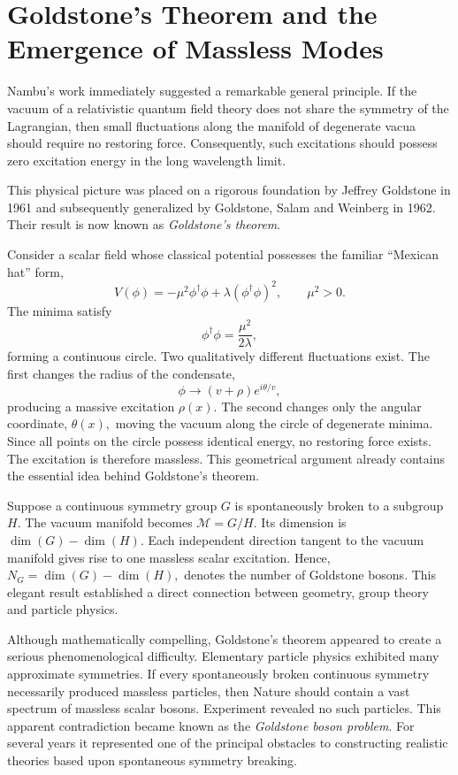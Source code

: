 \section{Goldstone's Theorem and the Emergence of Massless Modes}
\label{sec:goldstone_history}
Nambu's work immediately suggested a remarkable general principle.
If the vacuum of a relativistic quantum field theory does not share the
symmetry of the Lagrangian, then small fluctuations along the manifold
of degenerate vacua should require no restoring force. Consequently,
such excitations should possess zero excitation energy in the long
wavelength limit.

This physical picture was placed on a rigorous foundation by Jeffrey
Goldstone in 1961 and subsequently generalized by Goldstone, Salam and
Weinberg in 1962.
Their result is now known as \emph{Goldstone's theorem}.

Consider a scalar field whose classical potential possesses the familiar
``Mexican hat'' form,
\[V(\phi)=-\mu^2\phi^\dagger\phi
+\lambda(\phi^\dagger\phi)^2,\qquad\mu^2>0.\]
The minima satisfy
\[\phi^\dagger\phi=\frac{\mu^2}{2\lambda},\]
forming a continuous circle.
Two qualitatively different fluctuations exist.
The first changes the radius of the condensate,
\[\phi \rightarrow (v+\rho)e^{i\theta/v},\]
producing a massive excitation $\rho(x).$
The second changes only the angular coordinate,
$\theta(x),$
moving the vacuum along the circle of degenerate minima.
Since all points on the circle possess identical energy,
no restoring force exists.
The excitation is therefore massless.
This geometrical argument already contains the essential idea behind
Goldstone's theorem.

Suppose a continuous symmetry group $G$ is spontaneously broken to a
subgroup $H.$ The vacuum manifold becomes $\mathcal M=G/H.$
Its dimension is $\dim(G)-\dim(H).$
Each independent direction tangent to the vacuum manifold gives rise to
one massless scalar excitation.
Hence,$N_G=\dim(G)-\dim(H),$
denotes the number of Goldstone bosons.
This elegant result established a direct connection between geometry,
group theory and particle physics.

Although mathematically compelling, Goldstone's theorem appeared to
create a serious phenomenological difficulty.
Elementary particle physics exhibited many approximate symmetries.
If every spontaneously broken continuous symmetry necessarily produced
massless particles, then Nature should contain a vast spectrum of
massless scalar bosons.
Experiment revealed no such particles.
This apparent contradiction became known as the
\emph{Goldstone boson problem}.
For several years it represented one of the principal obstacles to
constructing realistic theories based upon spontaneous symmetry
breaking.

